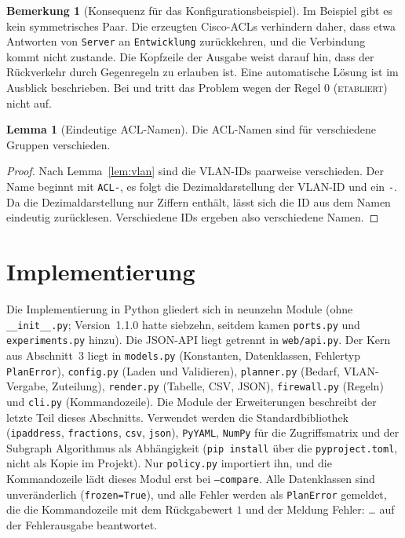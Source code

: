 \documentclass[a4paper,12pt, twoside]{report}
\theoremstyle{definition}
\newtheorem{lemma}{Lemma}
\newtheorem{bemerkung}{Bemerkung}
\newcommand{\code}[1]{\texttt{\detokenize{#1}}}
\begin{document}
\begin{bemerkung}[Konsequenz für das Konfigurationsbeispiel]
	Im Beispiel gibt es kein symmetrisches Paar. Die erzeugten Cisco-ACLs verhindern daher, dass etwa Antworten von \texttt{Server} an \texttt{Entwicklung} zurückkehren, und die Verbindung kommt nicht zustande. Die Kopfzeile der Ausgabe weist darauf hin, dass der Rückverkehr durch Gegenregeln zu erlauben ist. Eine automatische Lösung ist im Ausblick beschrieben. Bei \code{iptables} und \code{nftables} tritt das Problem wegen der Regel $0$ (\textsc{etabliert}) nicht auf.
\end{bemerkung}

\begin{lemma}[Eindeutige ACL-Namen]
	Die ACL-Namen \code{ACL-<VLAN>-<NAME>} sind für verschiedene Gruppen verschieden.
\end{lemma}

\begin{proof}
	Nach Lemma~\ref{lem:vlan} sind die VLAN-IDs paarweise verschieden. Der Name beginnt mit \texttt{ACL-}, es folgt die Dezimaldarstellung der VLAN-ID und ein \texttt{-}. Da die Dezimaldarstellung nur Ziffern enthält, lässt sich die ID aus dem Namen eindeutig zurücklesen. Verschiedene IDs ergeben also verschiedene Namen.
\end{proof}

\section{Implementierung}

Die Implementierung in Python gliedert sich in neunzehn Module (ohne \texttt{\_\_init\_\_.py}; Version~1.1.0 hatte siebzehn, seitdem kamen \texttt{ports.py} und \texttt{experiments.py} hinzu). Die JSON-API liegt getrennt in \texttt{web/api.py}. Der Kern aus Abschnitt~3 liegt in \texttt{models.py} (Konstanten, Datenklassen, Fehlertyp \texttt{PlanError}), \texttt{config.py} (Laden und Validieren), \texttt{planner.py} (Bedarf, VLAN-Vergabe, Zuteilung), \texttt{render.py} (Tabelle, CSV, JSON), \texttt{firewall.py} (Regeln) und \texttt{cli.py} (Kommandozeile). Die Module der Erweiterungen beschreibt der letzte Teil dieses Abschnitts. Verwendet werden die Standardbibliothek (\texttt{ipaddress}, \texttt{fractions}, \texttt{csv}, \texttt{json}), \texttt{PyYAML}, \texttt{NumPy} für die Zugriffsmatrix und der Subgraph Algorithmus als Abhängigkeit (\texttt{pip install} über die \texttt{pyproject.toml}, nicht als Kopie im Projekt). Nur \texttt{policy.py} importiert ihn, und die Kommandozeile lädt dieses Modul erst bei \texttt{--compare}. Alle Datenklassen sind unveränderlich (\texttt{frozen=True}), und alle Fehler werden als \texttt{PlanError} gemeldet, die die Kommandozeile mit dem Rückgabewert $1$ und der Meldung \glqq Fehler: \dots\grqq{} auf der Fehlerausgabe beantwortet.
\end{document}
